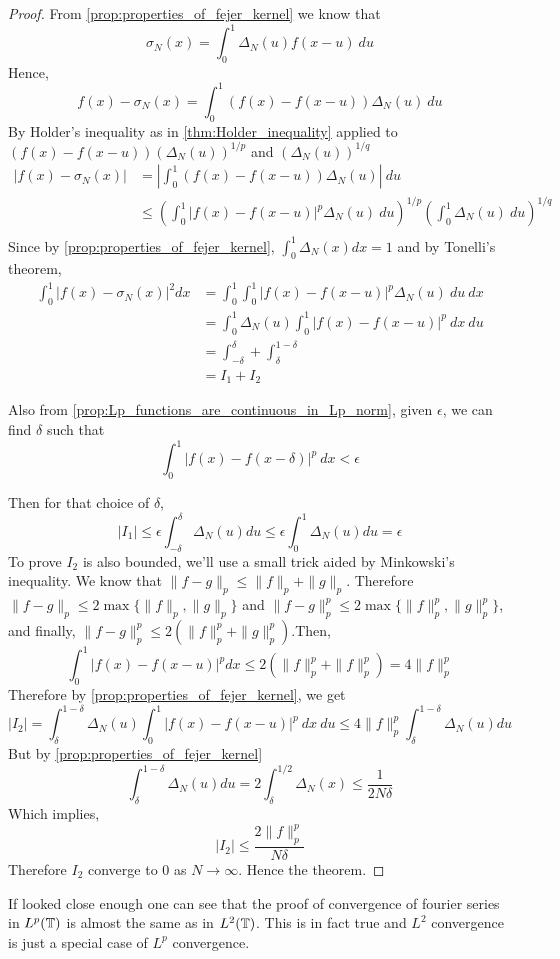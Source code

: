 \begin{proof}
  From \autoref{prop:properties_of_fejer_kernel} we know that
  \begin{displaymath}
    \sigma_N(x) = \int_0^1 \Delta_N(u)f(x-u) \ du 
  \end{displaymath}
  Hence,
  $$ f(x) - \sigma_N(x) = \int_0^1 (f(x) - f(x-u))\Delta_N(u) \ du $$ 
  By Holder's inequality as in \autoref{thm:Holder_inequality} applied to $(f(x) - f(x-u))(\Delta_N(u))^{1/p}$ and $(\Delta_N(u))^{1/q}$ 
  \begin{align*}
    |f(x) - \sigma_N(x)| &= \left| \int_0^1 (f(x) - f(x-u))\Delta_N(u) \right| \ du \\
          &\le \left( \int_0^1 |f(x) - f(x-u)|^{p} \Delta_N(u) \ du \right)^{1/p} \left( \int_0^1 \Delta_N(u) \ du \right)^{1/q} \\
  \end{align*}
  Since by \autoref{prop:properties_of_fejer_kernel}, $\int_0^1 \Delta_N(x) dx = 1$ and by Tonelli's theorem, 
  \begin{align*}
    \int_0^1 |f(x) - \sigma_N(x)|^2 dx &= \int_0^1 \int_0^1 |f(x) - f(x-u)|^{p} \Delta_N(u) \ du  \ dx \\
          & = \int_0^1 \Delta_N(u) \int_0^1 |f(x) - f(x-u)|^{p} \ dx  \ du \\
          & = \int_{-\delta}^\delta + \int_\delta^{1-\delta} \\
          & = I_1 + I_2
  \end{align*}

  Also from \autoref{prop:Lp_functions_are_continuous_in_Lp_norm}, given $\epsilon$, we can find $\delta$ such that 
  $$ \int_0^1|f(x) - f(x-\delta)|^p \ dx < \epsilon$$

  Then for that choice of $\delta$,
  $$|I_1| \le \epsilon \int_{-\delta}^\delta \Delta_N(u) du \le \epsilon \int_0^1 \Delta_N(u) du = \epsilon$$
 To prove $I_2$ is also bounded, we'll use a small trick aided by Minkowski's inequality. We know that $\|f-g\|_p \le \|f\|_p + \|g\|_p$. Therefore $\|f-g\|_p \le 2\max\{\|f\|_p, \|g\|_p\}$ and $\|f-g\|_p^p \le 2\max\{\|f\|_p^p, \|g\|_p^p\}$, and finally, $\|f-g\|_p^p \le 2(\|f\|_p^p + \|g\|_p^p)$.Then, 
  $$ \int_0^1 |f(x) - f(x-u)|^p dx \le 2(\|f\|_p^p + \|f\|_p^p) = 4\|f\|_p^p$$
  Therefore by \autoref{prop:properties_of_fejer_kernel}, we get 
  $$|I_2| = \int_\delta^{1-\delta} \Delta_N(u) \int_0^1 |f(x) - f(x-u)|^{p} \ dx  \ du \le 4\|f\|_p^p \int_\delta^{1-\delta}\Delta_N(u) du$$
  But by \autoref{prop:properties_of_fejer_kernel} 
  $$ \int_\delta^{1-\delta}\Delta_N(u)du = 2\int_\delta^{1/2}\Delta_N(x) \le \frac{1}{2N\delta}$$
  Which implies, 
  $$ |I_2| \le \frac{2\|f\|_p^p}{N\delta}$$
  Therefore $I_2$ converge to $0$ as $N \to \infty$. Hence the theorem.
\end{proof}

If looked close enough one can see that the proof of convergence of fourier series in $L^p(\mathbb T)$ is almost the same as in $L^2(\mathbb T)$. This is in fact true and $L^2$ convergence is just a special case of $L^p$ convergence.

